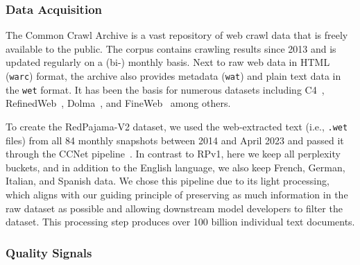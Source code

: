 \documentclass{article}
\begin{document}
\subsubsection{Data Acquisition} The Common Crawl Archive is a vast repository of web crawl data that is freely available to the public. The corpus contains crawling results since 2013 and is updated regularly on a (bi-) monthly basis. Next to raw web data in HTML (\texttt{warc}) format, the archive also provides metadata (\texttt{wat}) and plain text data in the \texttt{wet} format. It has been the basis for numerous datasets including C4~\cite{raffel2020exploring}, RefinedWeb~\cite{penedo2024refinedweb}, Dolma~\cite{soldaini2024dolma}, and FineWeb~\cite{penedo2024fineweb} among others.

To create the RedPajama-V2 dataset, we used the web-extracted text (i.e., \texttt{.wet} files) from all 84 monthly snapshots between 2014 and April 2023 and passed it through the CCNet pipeline~\cite{wenzek2019ccnet}. In contrast to RPv1, here we keep all perplexity buckets, and in addition to the English language, we also keep French, German, Italian, and Spanish data. We chose this pipeline due to its light processing, which aligns with our guiding principle of preserving as much information in the raw dataset as possible and allowing downstream model developers to filter the dataset. This processing step produces over 100 billion individual text documents.

\subsubsection{Quality Signals}
\label{subsec:rpv2-quality-signals}
\end{document}

